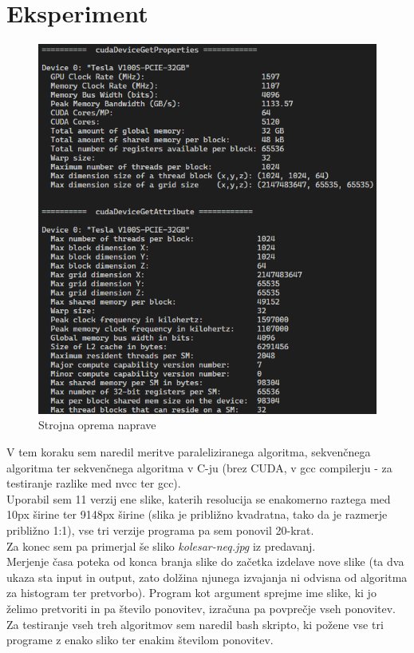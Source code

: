\documentclass{article}
\begin{document}
\section{Eksperiment}
\begin{figure}[!h]
    \centering
    \includegraphics[width=0.8\linewidth]{images/hardware.png}
    \caption{Strojna oprema naprave}
\end{figure}
V tem koraku sem naredil meritve paraleliziranega algoritma, sekvenčnega algoritma ter sekvenčnega algoritma v C-ju (brez CUDA, v gcc compilerju - za testiranje razlike med nvcc ter gcc).\\
Uporabil sem 11 verzij ene slike, katerih resolucija se enakomerno raztega med 10px širine ter 9148px širine (slika je približno kvadratna, tako da je razmerje približno 1:1), vse tri verzije programa pa sem ponovil 20-krat.\\
Za konec sem pa primerjal še sliko \textit{kolesar-neq.jpg} iz predavanj.\\
Merjenje časa poteka od konca branja slike do začetka izdelave nove slike (ta dva ukaza sta input in output, zato dolžina njunega izvajanja ni odvisna od algoritma za histogram ter pretvorbo). Program kot argument sprejme ime slike, ki jo želimo pretvoriti in pa število ponovitev, izračuna pa povprečje vseh ponovitev. Za testiranje vseh treh algoritmov sem naredil bash skripto, ki požene vse tri programe z enako sliko ter enakim številom ponovitev.\\\\
\end{document}
